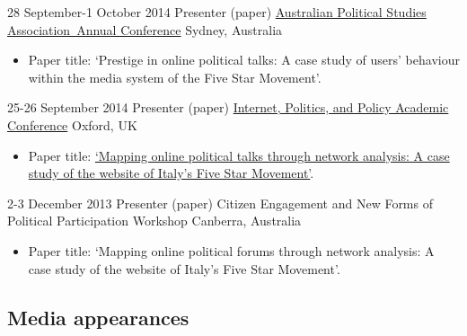 \documentclass[12pt,a4paper,sans]{moderncv}
\begin{document}
    \cventry
        {28 September-1 October 2014} %
    {Presenter (paper)} %
    {\href{https://sites.google.com/site/apsa2014/home}{Australian Political Studies Association Annual Conference}} %
    {Sydney, Australia} %
{}
    {
      \begin{itemize} %
        \item {Paper title: `Prestige in online political talks: A case study of users' behaviour within the media system of the Five Star Movement'.}
      \end{itemize}
    }

    \cventry
        {25-26 September 2014} %
    {Presenter (paper)} %
    {\href{http://ipp.oii.ox.ac.uk/2014}{Internet, Politics, and Policy Academic Conference}} %
    {Oxford, UK} %
{}
    {
      \begin{itemize} %
        \item {Paper title: \href{http://ipp.oii.ox.ac.uk/2014/programme-2014/track-d-networked-politics/political-and-personal-networks/francesco-bailo-mapping-online-political}{`Mapping online political talks through network analysis: A case study of the website of Italy's Five Star Movement'}.}
      \end{itemize}
    }

    \cventry
     {2-3 December 2013} %
    {Presenter (paper)} %
    {Citizen Engagement and New Forms of Political Participation Workshop} %
    {Canberra, Australia} %
    {}
    {
      \begin{itemize} %
        \item {Paper title: `Mapping online political forums through network analysis: A case study of the website of Italy's Five Star Movement'.}
      \end{itemize}
    }

\vspace{.5em}

\subsection{\hspace{-2.5cm}Media appearances}

\vspace{.5em}
\end{document}
